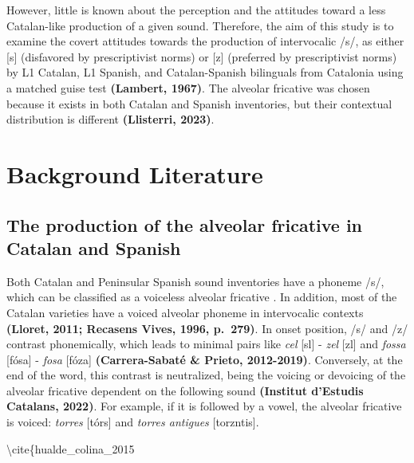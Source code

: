 \documentclass[
  a4paper,
  11pt,
  twocolumn]{article}
\begin{document}
However, little is known about the perception and the attitudes toward a
less Catalan-like production of a given sound. Therefore, the aim of
this study is to examine the covert attitudes towards the production of
intervocalic /s/, as either {[}s{]} (disfavored by prescriptivist norms)
or {[}z{]} (preferred by prescriptivist norms) by L1 Catalan, L1
Spanish, and Catalan-Spanish bilinguals from Catalonia using a matched
guise test \textbf{(Lambert, 1967)}. The alveolar fricative was chosen
because it exists in both Catalan and Spanish inventories, but their
contextual distribution is different \textbf{(Llisterri, 2023)}.

\section{Background Literature}

\subsection{The production of the alveolar fricative in Catalan and Spanish}

Both Catalan and Peninsular Spanish sound inventories have a phoneme
/s/, which can be classified as a voiceless alveolar fricative
\cite{hualde_colina_2015}. In addition, most of the Catalan varieties
have a voiced alveolar phoneme in intervocalic contexts \textbf{(Lloret,
2011; Recasens Vives, 1996, p.~279)}. In onset position, /s/ and /z/
contrast phonemically, which leads to minimal pairs like \emph{cel}
{[}s\textepsilon l{]} - \emph{zel} {[}z\textepsilon l{]} and
\emph{fossa} {[}fósa{]} - \emph{fosa} {[}fóza{]} \textbf{(Carrera-Sabaté
\& Prieto, 2012-2019)}. Conversely, at the end of the word, this
contrast is neutralized, being the voicing or devoicing of the alveolar
fricative dependent on the following sound \textbf{(Institut d'Estudis
Catalans, 2022)}. For example, if it is followed by a vowel, the
alveolar fricative is voiced: \emph{torres} {[}tór\textschwa{}s{]} and
\emph{torres antigues}
{[}tor\textschwa{}z\textschwa{}nti\textgamma{}\textschwa{}s{]}.

\textbackslash cite\{hualde\_colina\_2015
\end{document}
